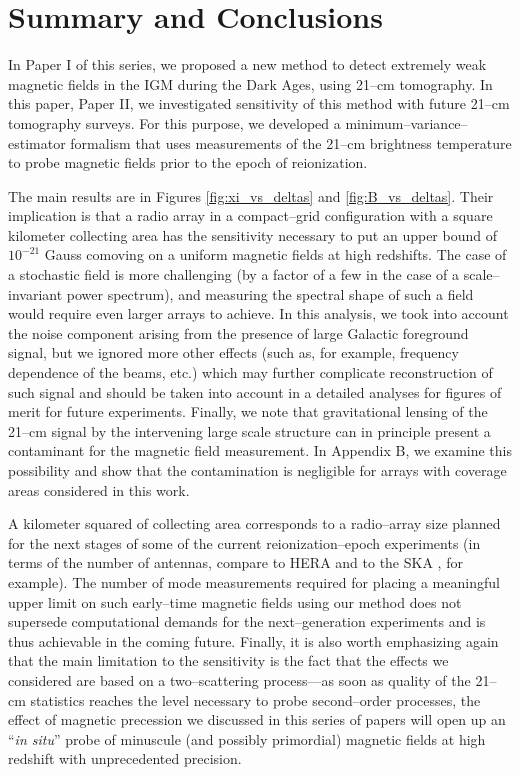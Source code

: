 \section{Summary and Conclusions}
\label{sec:conclusions}

In Paper I of this series, we proposed a new method to detect extremely weak magnetic fields in the IGM during the Dark Ages, using 21--cm tomography. In this paper, Paper II, we investigated sensitivity of this method with future 21--cm tomography surveys. For this purpose, we developed a minimum--variance--estimator formalism that uses measurements of the 21--cm brightness temperature to probe magnetic fields prior to the epoch of reionization. 

The main results are in Figures \ref{fig:xi_vs_deltas} and \ref{fig:B_vs_deltas}. Their implication is that a radio array in a compact--grid configuration with a square kilometer collecting area has the sensitivity necessary to put an upper bound of $10^{-21}$ Gauss comoving on a uniform magnetic fields at high redshifts. The case of a stochastic field is more challenging (by a factor of a few in the case of a scale--invariant power spectrum), and measuring the spectral shape of such a field would require even larger arrays to achieve. In this analysis, we took into account the noise component arising from the presence of large Galactic foreground signal, but we ignored more other effects (such as, for example, frequency dependence of the beams, etc.) which may further complicate reconstruction of such signal and should be taken into account in a detailed analyses for figures of merit for future experiments. Finally, we note that gravitational lensing of the 21--cm signal by the intervening large scale structure can in principle present a contaminant for the magnetic field measurement. In Appendix B, we examine this possibility and show that the contamination is negligible for arrays with coverage areas considered in this work.

A kilometer squared of collecting area corresponds to a radio--array size planned for the next stages of some of the current reionization--epoch experiments (in terms of the number of antennas, compare to HERA and to the SKA \cite{2008arXiv0802.1727C}, for example). The number of mode measurements required for placing a meaningful upper limit on such early--time magnetic fields using our method does not supersede computational demands for the next--generation  experiments and is thus achievable in the coming future. Finally, it is also worth emphasizing again that the main limitation to the sensitivity is the fact that the effects we considered are based on a two--scattering process---as soon as quality of the 21--cm statistics reaches the level necessary to probe second--order processes, the effect of magnetic precession we discussed in this series of papers will open up an ``\textit{in situ}'' probe of minuscule (and possibly primordial) magnetic fields at high redshift with unprecedented precision. 

  